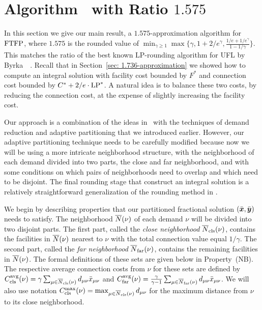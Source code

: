 \documentclass{llncs}
\begin{document}

\section{Algorithm~{\EBGS} with Ratio $1.575$}\label{sec: 1.575-approximation}

In this section we give our main result, a $1.575$-approximation
algorithm for $\mbox{\rm FTFP}$, where $1.575$ is the rounded value of $\min_{\gamma\geq
  1}\max\{\gamma, 1+2/e^\gamma, \frac{1/e+1/e^\gamma}{1-1/\gamma}\}$.
 This matches the ratio of the best
known LP-rounding algorithm for UFL by
Byrka~{\etal}~\cite{ByrkaGS10}. Recall that in Section~\ref{sec:
  1.736-approximation} we showed how to compute an integral solution
with facility cost bounded by $F^\ast$ and connection cost bounded by
$C^\ast + 2/e\cdot\mbox{\rm LP}^\ast$. A natural idea is to balance these two
costs, by reducing the connection cost, at the expense of slightly
increasing the facility cost.

Our approach is a combination of the ideas
in~\cite{ByrkaGS10} with the techniques of demand reduction and
adaptive partitioning that we introduced earlier. However, our
adaptive partitioning technique needs to be carefully modified because
now we will be using a more intricate neighborhood structure, with the
neighborhood of each demand divided into two parts, the close and far
neighborhood, and with some conditions on which pairs of neighborhoods
need to overlap and which need to be disjoint. The final rounding
stage that construct an integral solution is a relatively
straightforward generalization of the rounding method in
\cite{ByrkaGS10}.

We begin by describing properties that our partitioned fractional
solution $(\bar{\boldsymbol{x}},\bar{\boldsymbol{y}})$ needs to satisfy. The neighborhood
${\overline{N}}(\nu)$ of each demand $\nu$ will be divided into two disjoint
parts.  The first part, called the \emph{close neighborhood}
${\overline{N}}_{\text{cls}}(\nu)$, contains the facilities in ${\overline{N}}(\nu)$ nearest to
$\nu$ with the total connection value equal $1/\gamma$. The second
part, called the \emph{far neighborhood} ${\overline{N}}_{\text{far}}(\nu)$, contains
the remaining facilities in ${\overline{N}}(\nu)$. The formal definitions of
these sets are given below in Property~(NB).  The respective average
connection costs from $\nu$ for these sets are defined by
$C_{\text{cls}}^{{\mbox{\scriptsize\rm avg}}}(\nu)=\gamma\sum_{\mu\in{\overline{N}}_{\text{cls}}(\nu)}
d_{\mu\nu}{\bar x}_{\mu\nu}$ and
$C_{\text{far}}^{{\mbox{\scriptsize\rm avg}}}(\nu)=\frac{\gamma}{\gamma-1}\sum_{\mu\in{\overline{N}}_{\text{far}}(\nu)}
d_{\mu\nu}{\bar x}_{\mu\nu}$. We will also use notation
$C_{\text{cls}}^{\max}(\nu)=\max_{\mu\in{\overline{N}}_{\text{cls}}(\nu)} d_{\mu\nu}$ for the maximum
distance from $\nu$ to its close neighborhood.
\end{document}
